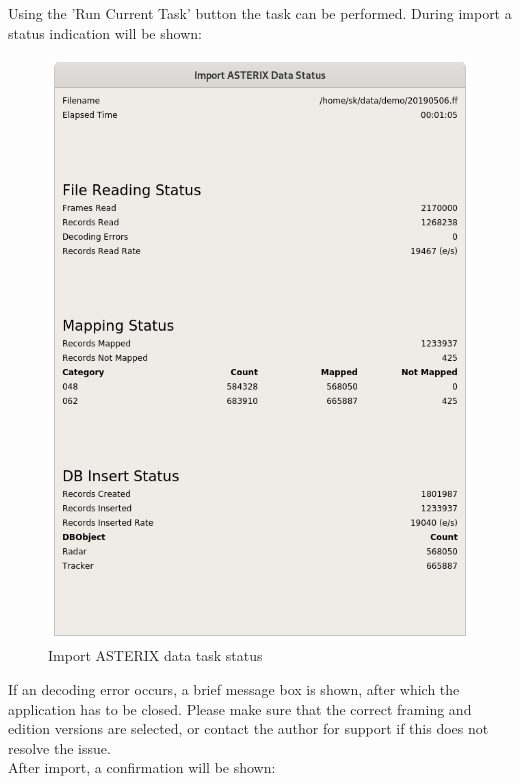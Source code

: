 Using the 'Run Current Task' button the task can be performed. During import a status indication will be shown:

\begin{figure}[H]
  \center
    \includegraphics[width=12cm]{../screenshots/asterix_import_status.png}
  \caption{Import ASTERIX data task status}
\end{figure}

If an decoding error occurs, a brief message box is shown, after which the application has to be closed. Please make sure that the correct framing and edition versions are selected, or contact the author for support if this does not resolve the issue. \\

After import, a confirmation will be shown:

